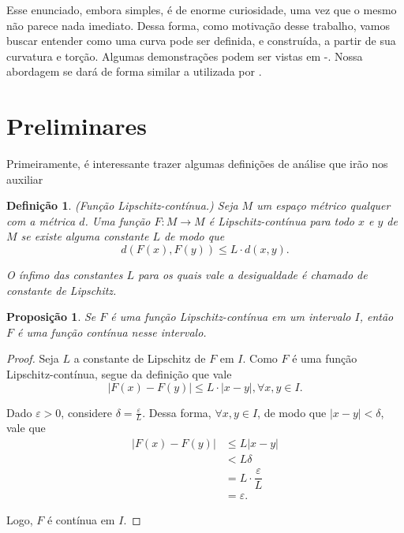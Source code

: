 \documentclass[11pt,letterpaper,twocolumn]{article}
\newtheorem{definition}{Definição}
\newtheorem{proposition}{Proposição}
\begin{document}
Esse enunciado, embora simples, é de enorme curiosidade, uma vez que o mesmo não parece nada imediato. Dessa forma, como motivação desse trabalho, vamos buscar entender como uma curva pode ser definida, e construída, a partir de sua curvatura e torção. Algumas demonstrações podem ser vistas em \cite{cruz}-\cite{picado}. Nossa abordagem se dará de forma similar a utilizada por \cite{coda}.

\section{Preliminares}
\justify
\label{preliminares}

Primeiramente, é interessante trazer algumas definições de análise que irão nos auxiliar

\begin{definition}(Função Lipschitz-contínua.)
    Seja $M$ um espaço métrico qualquer com a métrica $d$. Uma função $F : M\to M$ é Lipschitz-contínua para todo $x$ e $y$ de $M$ se existe alguma constante $L$ de modo que
    \[d(F(x), F(y))\leq L\cdot d(x, y).\]
    
    O ínfimo das constantes $L$ para os quais vale a desigualdade é chamado de constante de Lipschitz.
\end{definition}

\begin{proposition}
    Se $F$ é uma função Lipschitz-contínua em um intervalo $I$, então $F$ é uma função contínua nesse intervalo.
\end{proposition}

\begin{proof}
    Seja $L$ a constante de Lipschitz de $F$ em $I$. Como $F$ é uma função Lipschitz-contínua, segue da definição que vale
    \[|F(x) - F(y)|\leq L\cdot |x - y|, \forall x, y\in I.\]
    
    Dado $\varepsilon > 0$, considere $\delta = \frac{\varepsilon}{L}$. Dessa forma, $\forall x, y\in I$, de modo que $|x - y| < \delta$, vale que
    \begin{equation*}
        \begin{split}
            |F(x) - F(y)| & \leq L|x - y| \\
            & < L\delta \\
            & = L\cdot \dfrac{\varepsilon}{L} \\
            & = \varepsilon.
        \end{split}
    \end{equation*}
    
    Logo, $F$ é contínua em $I$.
\end{proof}
\end{document}
